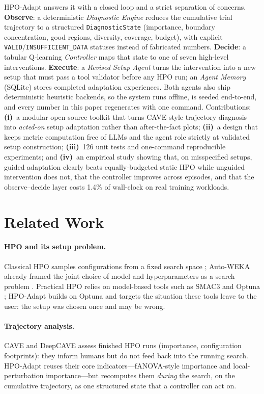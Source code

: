 \documentclass[10pt]{article}
\newcommand{\toolname}{HPO-Adapt}
\begin{document}
\toolname{} answers it with a closed loop and a strict separation of
concerns. \textbf{Observe}: a deterministic \emph{Diagnostic Engine}
reduces the cumulative trial trajectory to a structured
\texttt{DiagnosticState} (importance, boundary concentration, good
regions, diversity, coverage, budget), with explicit
\texttt{VALID}/\texttt{INSUFFICIENT\_DATA} statuses instead of fabricated
numbers. \textbf{Decide}: a tabular Q-learning \emph{Controller}
\cite{sutton2018reinforcement} maps that state to one of seven high-level
interventions. \textbf{Execute}: a \emph{Revised Setup Agent} turns the
intervention into a new setup that must pass a tool validator before any
HPO run; an \emph{Agent Memory} (SQLite) stores completed adaptation
experiences. Both agents also ship deterministic heuristic backends, so
the system runs offline, is seeded end-to-end, and every number in this
paper regenerates with one command. Contributions: \textbf{(i)}~a modular
open-source toolkit that turns CAVE-style trajectory diagnosis into
\emph{acted-on} setup adaptation rather than after-the-fact plots;
\textbf{(ii)}~a design that keeps metric computation free of LLMs and the
agent role strictly at validated setup construction; \textbf{(iii)}~126
unit tests and one-command reproducible experiments; and \textbf{(iv)}~an
empirical study showing that, on misspecified setups, guided adaptation
clearly beats equally-budgeted static HPO while unguided intervention does
not, that the controller improves across episodes, and that the
observe--decide layer costs 1.4\% of wall-clock on real training
workloads.

\section{Related Work}
\label{sec:related}

\paragraph{HPO and its setup problem.}
Classical HPO samples configurations from a fixed search space
\cite{feurer2019hyperparameter}; Auto-WEKA already framed the joint choice
of model and hyperparameters as a search problem
\cite{thornton2013autoweka}. Practical HPO relies on model-based tools
such as SMAC3 \cite{lindauer2019smac3} and Optuna
\cite{akiba2019optuna}; \toolname{} builds on Optuna and targets the
situation these tools leave to the user: the setup was chosen once and
may be wrong.

\paragraph{Trajectory analysis.}
CAVE \cite{eggensperger2019cave} and DeepCAVE \cite{segel2025deepcave}
assess finished HPO runs (importance, configuration footprints): they
inform humans but do not feed back into the running search. \toolname{}
reuses their core indicators---fANOVA-style importance and
local-perturbation importance---but recomputes them \emph{during} the
search, on the cumulative trajectory, as one structured state that a
controller can act on.
\end{document}

